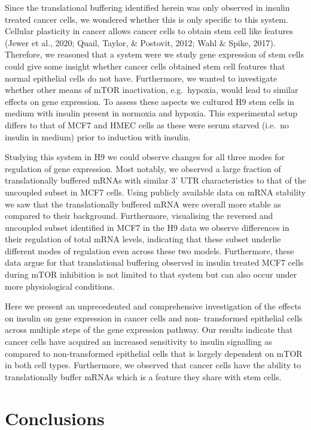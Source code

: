 \documentclass[
  12pt,
  openany]{book}
\begin{document}
Since the translational buffering identified herein was only observed in insulin treated cancer cells, we wondered whether this is only specific to this system. Cellular plasticity in cancer allows cancer cells to obtain stem cell like features (Jewer et al., 2020; Quail, Taylor, \& Postovit, 2012; Wahl \& Spike, 2017). Therefore, we reasoned that a system were we study gene expression of stem cells could give some insight whether cancer cells obtained stem cell features that normal epithelial cells do not have. Furthermore, we wanted to investigate whether other means of mTOR inactivation, e.g.~hypoxia, would lead to similar effects on gene expression. To assess these aspects we cultured H9 stem cells in medium with insulin present in normoxia and hypoxia. This experimental setup differs to that of MCF7 and HMEC cells as these were serum starved (i.e.~no insulin in medium) prior to induction with insulin.

Studying this system in H9 we could observe changes for all three modes for regulation of gene expression. Most notably, we observed a large fraction of translationally buffered mRNAs with similar 3' UTR characteristics to that of the uncoupled subset in MCF7 cells. Using publicly available data on mRNA stability we saw that the translationally buffered mRNA were overall more stable as compared to their background. Furthermore, visualising the reversed and uncoupled subset identified in MCF7 in the H9 data we observe differences in their regulation of total mRNA levels, indicating that these subset underlie different modes of regulation even across these two models. Furthermore, these data argue for that translational buffering observed in insulin treated MCF7 cells during mTOR inhibition is not limited to that system but can also occur under more physiological conditions.

Here we present an unprecedented and comprehensive investigation of the effects on insulin on gene expression in cancer cells and non- transformed epithelial cells across multiple steps of the gene expression pathway. Our results indicate that cancer cells have acquired an increased sensitivity to insulin signalling as compared to non-transformed epithelial cells that is largely dependent on mTOR in both cell types. Furthermore, we observed that cancer cells have the ability to translationally buffer mRNAs which is a feature they share with stem cells.

\chapter{Conclusions}
\end{document}
